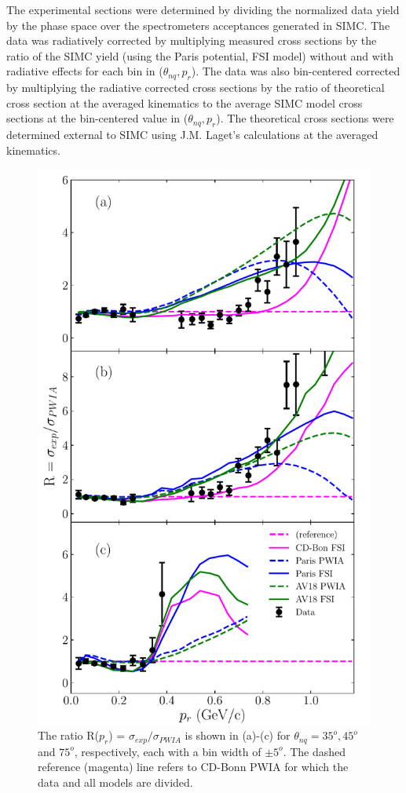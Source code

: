 \indent The experimental sections were determined by dividing the normalized data yield by the phase space over the spectrometers acceptances generated in SIMC. The data was radiatively corrected
by multiplying measured cross sections by the ratio of the SIMC yield (using the Paris potential, FSI model) without and with radiative effects for each bin in ($\theta_{nq}, p_{r}$).
The data was also bin-centered corrected by multiplying the radiative corrected cross sections by the ratio of theoretical cross section at the averaged kinematics to the average SIMC model
cross sections at the bin-centered value in ($\theta_{nq}, p_{r}$). The theoretical cross sections were determined external to SIMC using J.M. Laget's calculations at the averaged kinematics.\\
\begin{figure}
\includegraphics[scale=0.5]{prl_plots/PRL_plot2.pdf}
\caption{\label{fig:fig1} The ratio R($p_{r}$) = $\sigma_{exp}/\sigma_{PWIA}$ is shown in (a)-(c) for $\theta_{nq}=35^{o}, 45^{o}$ and $75^{o}$, respectively, each with a bin width of $\pm 5^{o}$.
                          The dashed reference (magenta) line refers to CD-Bonn PWIA for which the data and all models are divided. }
\end{figure}
